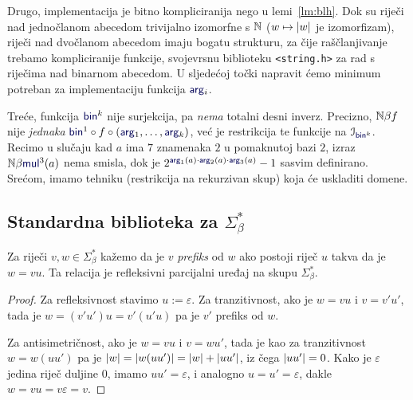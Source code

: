 Drugo, implementacija je bitno kompliciranija nego u lemi~\ref{lm:blh}. Dok su riječi nad jednočlanom abecedom trivijalno izomorfne s ${\mathbb N}$ ($w\mapsto\lvert w\rvert$ je izomorfizam), riječi nad dvočlanom abecedom imaju bogatu strukturu, za čije raščlanjivanje trebamo kompliciranije funkcije, svojevrsnu biblioteku \texttt{<string.h>} za rad s riječima nad binarnom abecedom. U sljedećoj točki napravit ćemo minimum potreban za implementaciju funkcija $\f{arg}_i$.

Treće, funkcija $\f{bin}^k$ nije surjekcija, pa \emph{nema} totalni desni inverz. Precizno, ${\mathbb N}\beta f$ nije \emph{jednaka} $\f{bin}^1\circ f\circ(\f{arg}_1,\dotsc,\f{arg}_k)$, već je restrikcija te funkcije na $\im{\f{bin}^k}$. %
Recimo u slučaju kad $a$ ima $7$ znamenaka $2$ u pomaknutoj bazi $2$, izraz $\N\beta\f{mul}^3(a)$ nema smisla, dok je $2^{\f{arg}_1(a)\cdot\f{arg}_2(a)\cdot\f{arg}_3(a)}-1$ sasvim definirano. Srećom, imamo tehniku (restrikcija na rekurzivan skup) koja će uskladiti domene.

\subsection{Standardna biblioteka za \texorpdfstring{$\Sigma_\beta^*$}{binarne stringove}}\label{sec:stdstring}

\begin{propozicija}[{name=["biti prefiks" je parcijalni uređaj]}]\label{pp:prefiksrpu}
Za riječi $v,w\in\Sigma_\beta^*$ kažemo da je $v$ \emph{prefiks} od $w$ ako postoji riječ $u$ takva da je $w=vu$.
Ta relacija je refleksivni parcijalni uređaj na skupu $\Sigma_\beta^*$.
\end{propozicija}
\begin{proof}
Za refleksivnost stavimo $u:=\varepsilon$. Za tranzitivnost, ako je $w=vu$ i $v=v'u'$, tada je $w=(v'u')u=v'(u'u)$ pa je $v'$ prefiks od $w$.

Za antisimetričnost, ako je $w=vu$ i $v=wu'$, tada je kao za tranzitivnost $w=w(uu')$ pa je $\lvert w\rvert=\lvert w(uu')\rvert=\lvert w\rvert+\lvert uu'\rvert$, iz čega $\lvert uu'\rvert=0$. Kako je $\varepsilon$ jedina riječ duljine $0$, imamo $uu'=\varepsilon$, i analogno $u=u'=\varepsilon$, dakle $w=vu=v\varepsilon=v$.
\end{proof}

